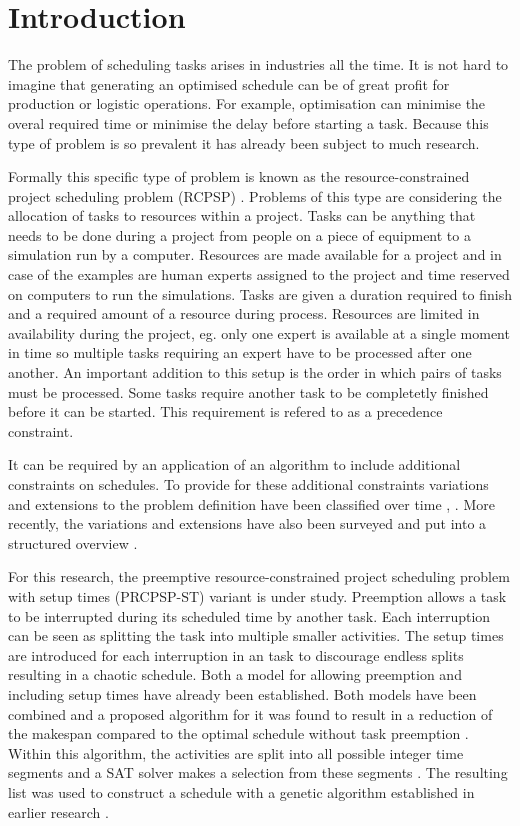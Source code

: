 \section{Introduction}
The problem of scheduling tasks arises in industries all the time. It is not hard to imagine that generating an optimised schedule can be of great profit for production or logistic operations. For example, optimisation can minimise the overal required time or minimise the delay before starting a task. Because this type of problem is so prevalent it has already been subject to much research.

Formally this specific type of problem is known as the resource-constrained project scheduling problem (RCPSP) \cite{RN69,RN66,RN70}. Problems of this type are considering the allocation of tasks to resources within a project. Tasks can be anything that needs to be done during a project from people on a piece of equipment to a simulation run by a computer. Resources are made available for a project and in case of the examples are human experts assigned to the project and time reserved on computers to run the simulations. Tasks are given a duration required to finish and a required amount of a resource during process. Resources are limited in availability during the project, eg. only one expert is available at a single moment in time so multiple tasks requiring an expert have to be processed after one another. An important addition to this setup is the order in which pairs of tasks must be processed. Some tasks require another task to be completetly finished before it can be started. This requirement is refered to as a precedence constraint.

It can be required by an application of an algorithm to include additional constraints on schedules. To provide for these additional constraints variations and extensions to the problem definition have been classified over time \cite{RN9}, \cite{RN10}. More recently, the variations and extensions have also been surveyed and put into a structured overview \cite{RN6}.


For this research, the preemptive resource-constrained project scheduling problem with setup times (PRCPSP-ST) variant is under study. Preemption allows a task to be interrupted during its scheduled time by another task. Each interruption can be seen as splitting the task into multiple smaller activities. The setup times are introduced for each interruption in an task to discourage endless splits resulting in a chaotic schedule. Both a model for allowing preemption \cite{RN21} and including setup times \cite{RN13} have already been established. Both models have been combined and a proposed algorithm for it was found to result in a reduction of the makespan compared to the optimal schedule without task preemption \cite{RN1}. Within this algorithm, the activities are split into all possible integer time segments and a SAT solver makes a selection from these segments \cite{RN3}. The resulting list was used to construct a schedule with a genetic algorithm established in earlier research \cite{RN14}.

